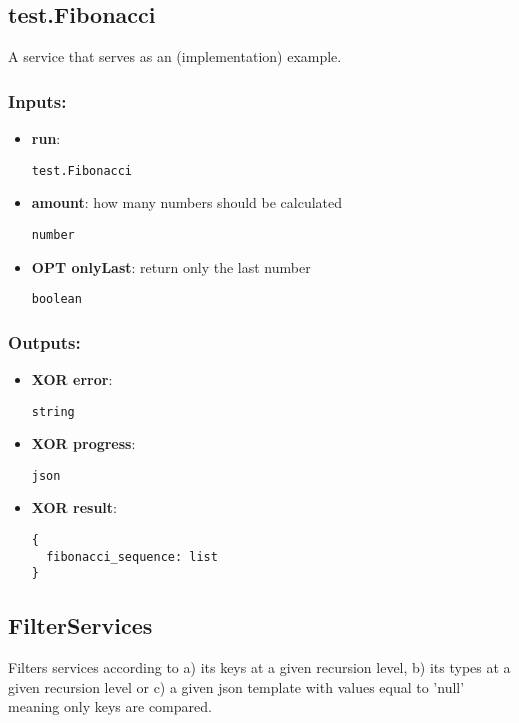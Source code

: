 \subsection{test.Fibonacci}
\label{ch:builtinservices:test.Fibonacci}
A service that serves as an (implementation) example.
\subsubsection*{Inputs:}
\begin{itemize}
    \item \textbf{run}: 
\begin{lstlisting}
test.Fibonacci
\end{lstlisting}
    \item \textbf{amount}: how many numbers should be calculated
\begin{lstlisting}
number
\end{lstlisting}
    \item \textbf{OPT onlyLast}: return only the last number
\begin{lstlisting}
boolean
\end{lstlisting}
  \end{itemize}

\subsubsection*{Outputs:}
\begin{itemize}
    \item \textbf{XOR error}: 
\begin{lstlisting}
string
\end{lstlisting}
    \item \textbf{XOR progress}: 
\begin{lstlisting}
json
\end{lstlisting}
    \item \textbf{XOR result}: 
\begin{lstlisting}
{
  fibonacci_sequence: list
}
\end{lstlisting}
  \end{itemize}

\subsection{FilterServices}
\label{ch:builtinservices:FilterServices}
Filters
 services according to a) its keys at a given recursion level, b) its 
types at a given recursion level or c) a given json template with values
 equal to 'null' meaning only keys are compared.
